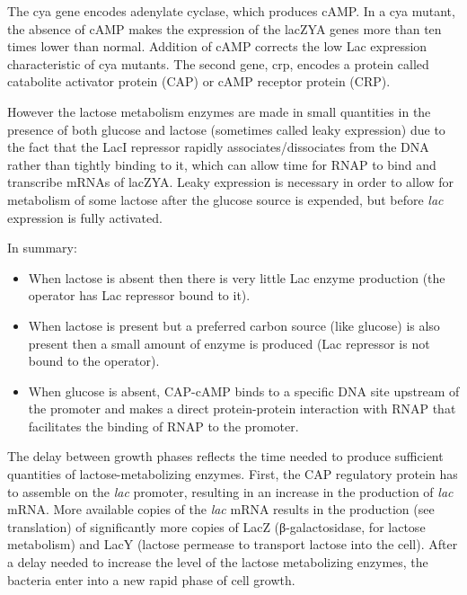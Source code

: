 The cya gene encodes adenylate cyclase, which produces cAMP. In a cya mutant, the absence of cAMP makes the expression of the lacZYA genes more than ten times lower than normal. Addition of cAMP corrects the low Lac expression characteristic of cya mutants. The second gene, crp, encodes a protein called catabolite activator protein (CAP) or cAMP receptor protein (CRP).

However the lactose metabolism enzymes are made in small quantities in the presence of both glucose and lactose (sometimes called leaky expression) due to the fact that the LacI repressor rapidly associates/dissociates from the DNA rather than tightly binding to it, which can allow time for RNAP to bind and transcribe mRNAs of lacZYA. Leaky expression is necessary in order to allow for metabolism of some lactose after the glucose source is expended, but before \emph{lac} expression is fully activated.

In summary:

\begin{itemize}
\tightlist
\item
  When lactose is absent then there is very little Lac enzyme production (the operator has Lac repressor bound to it).
\item
  When lactose is present but a preferred carbon source (like glucose) is also present then a small amount of enzyme is produced (Lac repressor is not bound to the operator).
\item
  When glucose is absent, CAP-cAMP binds to a specific DNA site upstream of the promoter and makes a direct protein-protein interaction with RNAP that facilitates the binding of RNAP to the promoter.
\end{itemize}

The delay between growth phases reflects the time needed to produce sufficient quantities of lactose-metabolizing enzymes. First, the CAP regulatory protein has to assemble on the \emph{lac} promoter, resulting in an increase in the production of \emph{lac} mRNA. More available copies of the \emph{lac} mRNA results in the production (see translation) of significantly more copies of LacZ (β-galactosidase, for lactose metabolism) and LacY (lactose permease to transport lactose into the cell). After a delay needed to increase the level of the lactose metabolizing enzymes, the bacteria enter into a new rapid phase of cell growth.

